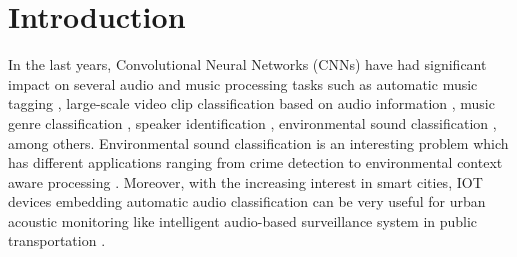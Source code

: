 \documentclass[preprint,final,12pt]{elsarticle}
\begin{document}
\section{Introduction}
\label{sec:intro}
In the last years, Convolutional Neural Networks (CNNs) have had significant impact on several audio and music processing tasks such as automatic music tagging \citep{dieleman2014end}, large-scale video clip classification based on audio information \citep{hershey2017cnn}, music genre classification \citep{Costa2017}, speaker identification \citep{Ravanelli2018}, environmental sound classification \citep{piczak2015environmental,2017deepsalamon,pons2018randomly,simonyan2014very, tokozume2017learning} , among others. Environmental sound classification is an interesting problem \citep{sigtia2016automaticreview,stowell2015detectionreview} which has different applications ranging from crime detection \citep{radhakrishnan2005audiocrime} to environmental context aware processing \citep{chu2009environmental}. Moreover, with the increasing interest in smart cities, IOT devices embedding automatic audio classification can be very useful for urban acoustic monitoring  \citep{mydlarz2017urbanmonitoring} like intelligent audio-based surveillance system in public transportation \citep{laffitte2019assessing}.
\end{document}
